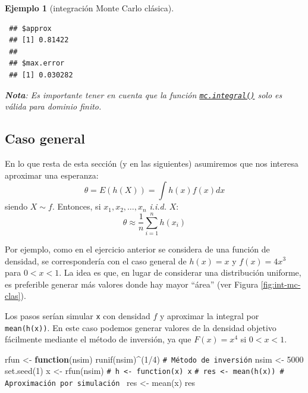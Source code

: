 \documentclass[
  10pt,
]{book}
\newenvironment{Shaded}{\begin{snugshade}}{\end{snugshade}}
\newcommand{\CommentTok}[1]{\textcolor[rgb]{0.56,0.35,0.01}{\textit{#1}}}
\newcommand{\ControlFlowTok}[1]{\textcolor[rgb]{0.13,0.29,0.53}{\textbf{#1}}}
\newcommand{\DecValTok}[1]{\textcolor[rgb]{0.00,0.00,0.81}{#1}}
\newcommand{\FunctionTok}[1]{\textcolor[rgb]{0.00,0.00,0.00}{#1}}
\newcommand{\NormalTok}[1]{#1}
\newcommand{\OtherTok}[1]{\textcolor[rgb]{0.56,0.35,0.01}{#1}}
\newcommand{\SpecialCharTok}[1]{\textcolor[rgb]{0.00,0.00,0.00}{#1}}
\theoremstyle{break}
\newtheorem{example}{Ejemplo}[chapter]
\theoremstyle{nonumberplain}
\renewcommand{\CommentTok}[1]{\textcolor[rgb]{0.41,0.41,0.41}{\texttt{#1}}}
\begin{document}
\begin{example}[integración Monte Carlo clásica]
\begin{verbatim}
 ## $approx
 ## [1] 0.81422
 ## 
 ## $max.error
 ## [1] 0.030282
\end{verbatim}

\textbf{Nota}: Es importante tener en cuenta que la función \href{https://rubenfcasal.github.io/simres/reference/mc.integral.html}{\texttt{mc.integral()}} solo es válida para dominio finito.
\end{example}

\hypertarget{caso-general}{%
\subsection{Caso general}\label{caso-general}}

En lo que resta de esta sección (y en las siguientes) asumiremos que nos interesa aproximar una esperanza:
\[\theta = E\left( h\left( X\right) \right) = \int h\left( x\right) f(x)dx\]
siendo \(X\sim f\).
Entonces, si \(x_1,x_2,\ldots ,x_n\) \emph{i.i.d.} \(X\):
\[\theta \approx \frac{1}{n}\sum\limits_{i=1}^nh\left( x_i\right)\]

Por ejemplo, como en el ejercicio anterior se considera de una función de densidad,
se correspondería con el caso general de \(h(x) = x\) y \(f(x) = 4x^3\) para \(0<x<1\).
La idea es que, en lugar de considerar una distribución uniforme,
es preferible generar más valores donde hay mayor ``área'' (ver Figura \ref{fig:int-mc-clas}).

Los pasos serían simular \texttt{x} con densidad \(f\) y aproximar la integral por \texttt{mean(h(x))}.
En este caso podemos generar valores de la densidad objetivo fácilmente mediante el método de inversión, ya que \(F(x) = x^4\) si \(0<x<1\).

\begin{Shaded}
\begin{Highlighting}[]
\NormalTok{rfun }\OtherTok{\textless{}{-}} \ControlFlowTok{function}\NormalTok{(nsim) }\FunctionTok{runif}\NormalTok{(nsim)}\SpecialCharTok{\^{}}\NormalTok{(}\DecValTok{1}\SpecialCharTok{/}\DecValTok{4}\NormalTok{) }\CommentTok{\# Método de inversión}
\NormalTok{nsim }\OtherTok{\textless{}{-}} \DecValTok{5000}
\FunctionTok{set.seed}\NormalTok{(}\DecValTok{1}\NormalTok{)}
\NormalTok{x }\OtherTok{\textless{}{-}} \FunctionTok{rfun}\NormalTok{(nsim)}
\CommentTok{\# h \textless{}{-} function(x) x}
\CommentTok{\# res \textless{}{-} mean(h(x)) \# Aproximación por simulación }
\NormalTok{res }\OtherTok{\textless{}{-}} \FunctionTok{mean}\NormalTok{(x)}
\NormalTok{res}
\end{Highlighting}
\end{Shaded}
\end{document}
